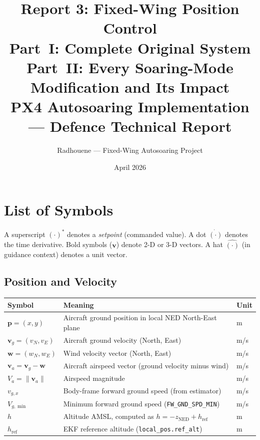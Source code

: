 \documentclass[12pt,a4paper]{article}
\title{\textbf{Report 3: Fixed-Wing Position Control}\\[0.4em]
\large \textbf{Part~I:} Complete Original System\\
\textbf{Part~II:} Every Soaring-Mode Modification and Its Impact\\[0.5em]
\normalsize PX4 Autosoaring Implementation --- Defence Technical Report}
\author{Radhouene --- Fixed-Wing Autosoaring Project}
\date{April 2026}
\begin{document}
\maketitle
\tableofcontents
\newpage

\section*{List of Symbols}

A superscript $(\cdot)^*$ denotes a \emph{setpoint} (commanded value).
A dot $\dot{(\cdot)}$ denotes the time derivative.
Bold symbols ($\mathbf{v}$) denote 2-D or 3-D vectors.
A hat $\hat{(\cdot)}$ (in guidance context) denotes a unit vector.

\subsection*{Position and Velocity}
\begin{center}\begin{tabular}{lll}\toprule
Symbol & Meaning & Unit \\\midrule
$\mathbf{p} = (x, y)$ & Aircraft ground position in local NED North-East plane & m \\
$\mathbf{v}_g = (v_N, v_E)$ & Aircraft ground velocity (North, East) & m/s \\
$\mathbf{w} = (w_N, w_E)$ & Wind velocity vector (North, East) & m/s \\
$\mathbf{v}_a = \mathbf{v}_g - \mathbf{w}$ & Aircraft airspeed vector (ground velocity minus wind) & m/s \\
$V_a = \|\mathbf{v}_a\|$ & Airspeed magnitude & m/s \\
$v_{g,x}$ & Body-frame forward ground speed (from estimator) & m/s \\
$V_{g,\min}$ & Minimum forward ground speed (\texttt{FW\_GND\_SPD\_MIN}) & m/s \\
$h$ & Altitude AMSL, computed as $h = -z_{\text{NED}} + h_{\text{ref}}$ & m \\
$h_{\text{ref}}$ & EKF reference altitude (\texttt{local\_pos.ref\_alt}) & m \\
\bottomrule\end{tabular}\end{center}
\end{document}
